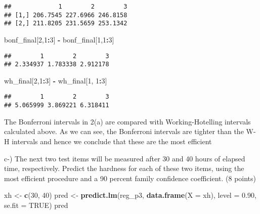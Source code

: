 \documentclass[
]{article}
\newenvironment{Shaded}{\begin{snugshade}}{\end{snugshade}}
\newcommand{\DataTypeTok}[1]{\textcolor[rgb]{0.13,0.29,0.53}{#1}}
\newcommand{\DecValTok}[1]{\textcolor[rgb]{0.00,0.00,0.81}{#1}}
\newcommand{\FloatTok}[1]{\textcolor[rgb]{0.00,0.00,0.81}{#1}}
\newcommand{\KeywordTok}[1]{\textcolor[rgb]{0.13,0.29,0.53}{\textbf{#1}}}
\newcommand{\NormalTok}[1]{#1}
\newcommand{\OperatorTok}[1]{\textcolor[rgb]{0.81,0.36,0.00}{\textbf{#1}}}
\newcommand{\OtherTok}[1]{\textcolor[rgb]{0.56,0.35,0.01}{#1}}
\newcommand{\StringTok}[1]{\textcolor[rgb]{0.31,0.60,0.02}{#1}}
\begin{document}
\begin{verbatim}
##             1        2        3
## [1,] 206.7545 227.6966 246.8158
## [2,] 211.8205 231.5659 253.1342
\end{verbatim}

\begin{Shaded}
\begin{Highlighting}[]
\NormalTok{bonf_final[}\DecValTok{2}\NormalTok{,}\DecValTok{1}\OperatorTok{:}\DecValTok{3}\NormalTok{] }\OperatorTok{-}\StringTok{ }\NormalTok{bonf_final[}\DecValTok{1}\NormalTok{,}\DecValTok{1}\OperatorTok{:}\DecValTok{3}\NormalTok{]}
\end{Highlighting}
\end{Shaded}

\begin{verbatim}
##        1        2        3 
## 2.334937 1.783338 2.912178
\end{verbatim}

\begin{Shaded}
\begin{Highlighting}[]
\NormalTok{wh_final[}\DecValTok{2}\NormalTok{,}\DecValTok{1}\OperatorTok{:}\DecValTok{3}\NormalTok{] }\OperatorTok{-}\StringTok{ }\NormalTok{wh_final[}\DecValTok{1}\NormalTok{, }\DecValTok{1}\OperatorTok{:}\DecValTok{3}\NormalTok{]}
\end{Highlighting}
\end{Shaded}

\begin{verbatim}
##        1        2        3 
## 5.065999 3.869221 6.318411
\end{verbatim}

The Bonferroni intervals in 2(a) are compared with Working-Hotelling
intervals calculated above. As we can see, the Bonferroni intervals are
tighter than the W-H intervals and hence we conclude that these are the
most efficient

c-) The next two test items will be measured after 30 and 40 hours of
elapsed time, respectively. Predict the hardness for each of these two
items, using the most efficient procedure and a 90 percent family
confidence coefficient. (8 points)

\begin{Shaded}
\begin{Highlighting}[]
\NormalTok{xh <-}\StringTok{ }\KeywordTok{c}\NormalTok{(}\DecValTok{30}\NormalTok{, }\DecValTok{40}\NormalTok{)}
\NormalTok{pred <-}\StringTok{ }\KeywordTok{predict.lm}\NormalTok{(reg_p3, }\KeywordTok{data.frame}\NormalTok{(}\DataTypeTok{X =}\NormalTok{ xh), }\DataTypeTok{level =} \FloatTok{0.90}\NormalTok{, }\DataTypeTok{se.fit =} \OtherTok{TRUE}\NormalTok{) }
\NormalTok{pred}
\end{Highlighting}
\end{Shaded}
\end{document}
